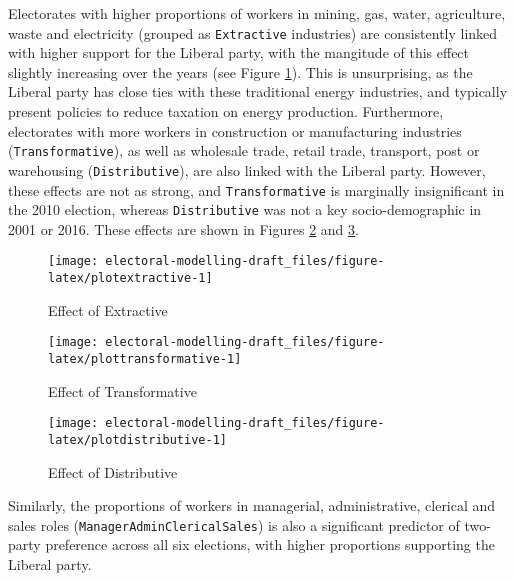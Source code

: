 \documentclass[openany]{book}
\begin{document}
Electorates with higher proportions of workers in mining, gas, water, agriculture, waste and electricity (grouped as \texttt{Extractive} industries) are consistently linked with higher support for the Liberal party, with the mangitude of this effect slightly increasing over the years (see Figure \ref{fig:plotextractive}). This is unsurprising, as the Liberal party has close ties with these traditional energy industries, and typically present policies to reduce taxation on energy production. Furthermore, electorates with more workers in construction or manufacturing industries (\texttt{Transformative}), as well as wholesale trade, retail trade, transport, post or warehousing (\texttt{Distributive}), are also linked with the Liberal party. However, these effects are not as strong, and \texttt{Transformative} is marginally insignificant in the 2010 election, whereas \texttt{Distributive} was not a key socio-demographic in 2001 or 2016. These effects are shown in Figures \ref{fig:plottransformative} and \ref{fig:plotdistributive}.

\begin{figure}[h]

{\centering \texttt{[image: electoral-modelling-draft\_files/figure-latex/plotextractive-1]} 

}

\caption{Effect of Extractive}\label{fig:plotextractive}
\end{figure}

\begin{figure}[h]

{\centering \texttt{[image: electoral-modelling-draft\_files/figure-latex/plottransformative-1]} 

}

\caption{Effect of Transformative}\label{fig:plottransformative}
\end{figure}
\begin{figure}[h]

{\centering \texttt{[image: electoral-modelling-draft\_files/figure-latex/plotdistributive-1]} 

}

\caption{Effect of Distributive}\label{fig:plotdistributive}
\end{figure}

Similarly, the proportions of workers in managerial, administrative, clerical and sales roles (\texttt{ManagerAdminClericalSales}) is also a significant predictor of two-party preference across all six elections, with higher proportions supporting the Liberal party.
\end{document}
